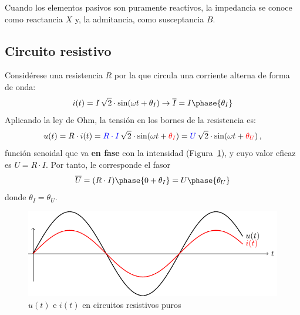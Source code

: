 \begin{remark}
  Cuando los elementos pasivos son puramente reactivos, la impedancia
  se conoce como reactancia $X$ y, la admitancia, como susceptancia
  $B$.
\end{remark}
			
\subsection{Circuito resistivo}\label{sec:R-puro}
	
Considérese una resistencia $R$ por la que circula una corriente
alterna de forma de onda:
\begin{equation*}
  i(t)=I\,\sqrt{2}\cdot\sin(\omega t+\theta_I)\rightarrow\overline{I}=I\phase{\theta_I}
\end{equation*}
Aplicando la ley de Ohm, la tensión en los bornes de la resistencia
es:
\begin{equation*}
  u(t)=R\cdot i(t) ={\color{blue}R\cdot I}\,\sqrt{2}\cdot\sin(\omega t+{\color{red}\theta_I})={\color{blue}U}\,\sqrt{2}\cdot\sin(\omega t+{\color{red}\theta_U})\,,
\end{equation*}
función senoidal que va \textbf{en fase} con la intensidad
(Figura~\ref{fig:resistivo}), y cuyo valor eficaz es $U=R\cdot I$. Por
tanto, le corresponde el fasor
\begin{equation*}
  \overline{U}=(R\cdot I)\phase{0+\theta_I}=U\phase{\theta_U}
\end{equation*}
donde $\theta_I=\theta_U$.
\begin{figure}[H]
  \centering \includegraphics{../figs/resistivo.pdf}
  \caption{$u(t)$ e $i(t)$ en circuitos resistivos puros}
  \label{fig:resistivo}
\end{figure}
	
